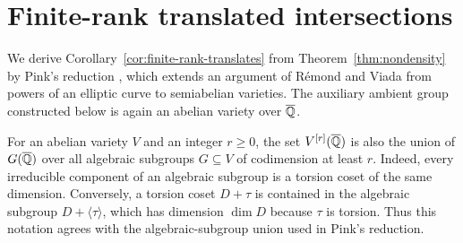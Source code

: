 \section{Finite-rank translated intersections}\label{sec:finite-rank}

We derive Corollary~\ref{cor:finite-rank-translates} from
Theorem~\ref{thm:nondensity} by Pink's reduction
\cite[Theorem~5.3]{Pink2005}, which extends an argument of
R\'emond and Viada \cite[Proposition~4.2]{RemondViada2003} from powers
of an elliptic curve to semiabelian varieties.  The auxiliary ambient
group constructed below is again an abelian variety over $\overline{\mathbb Q}$.

For an abelian variety $V$ and an integer $r\ge0$, the set
$V^{[r]}(\overline{\mathbb Q})$ is also the union of $G(\overline{\mathbb Q})$ over all algebraic
subgroups $G\subseteq V$ of codimension at least $r$. Indeed, every
irreducible component of an algebraic subgroup is a torsion coset of
the same dimension. Conversely, a torsion coset $D+\tau$ is contained
in the algebraic subgroup $D+\langle\tau\rangle$, which has dimension
$\dim D$ because $\tau$ is torsion. Thus this notation agrees with the
algebraic-subgroup union used in Pink's reduction.

